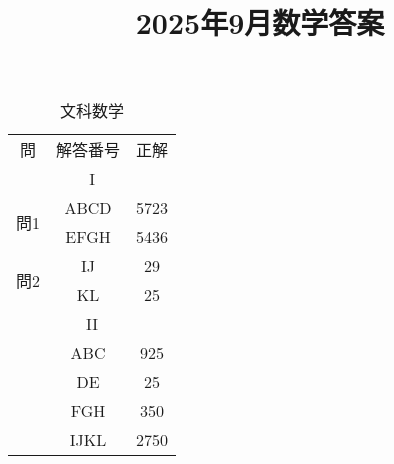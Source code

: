 \documentclass{jsarticle}
\title{\textbf{2025年9月数学答案}}
\date{}
\begin{document}
\maketitle
\begin{CJK}{UTF8}{min}

\begin{table}[htbp]
\centering
\renewcommand{\arraystretch}{1.1}
\begin{minipage}[t]{0.48\textwidth}
\centering
\caption*{文科数学}
\begin{tabular}{|c|c|c|}
\hline
\multirow{2}{*}{問} & \multirow{2}{*}{解答番号} & \multirow{2}{*}{正解} \\
 &  & \\
\hline
\multicolumn{3}{|c|}{I} \\
\hline
\multirow{2}{*}{問1} 
 & \textsf{ABCD} & 5723 \\
 & \textsf{EFGH} & 5436\\
 

\hline
\multirow{2}{*}{問2} 
 & \textsf{IJ} & 29 \\
 & \textsf{KL} & 25 \\

\hline
\multicolumn{3}{|c|}{II} \\
\hline
 & \textsf{ABC} & 925 \\
 & \textsf{DE} & 25\\
 & \textsf{FGH} & 350\\
 & \textsf{IJKL} & 2750 \\


\end{tabular}
\end{minipage}
\end{table}
\end{CJK}
\end{document}
